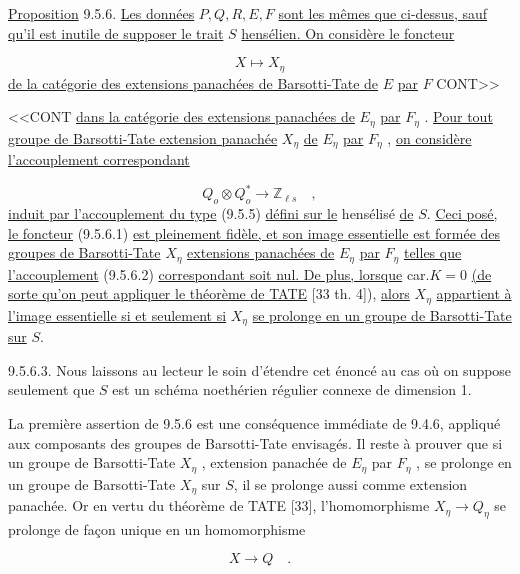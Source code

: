 \underline{Proposition} 9.5.6. \underline{Les données} $P,Q,R,E,F$ \underline{sont les mêmes que ci-dessus, sauf qu'il est inutile de supposer le trait} $S$ \underline{hensélien. On considère le foncteur}

\begin{equation}\tag{9.5.6.1}
X \longmapsto X_\eta
\end{equation}
\underline{de la catégorie des extensions panachées de Barsotti-Tate de} $E$ \underline{par} $F$ CONT>>



<<CONT \underline{dans la catégorie des extensions panachées de} $E_\eta$ \underline{par} $F_\eta$ . \underline{Pour tout groupe de Barsotti-Tate extension panachée} $X_\eta$ \underline{de} $E_\eta$ \underline{par} $F_\eta$ , \underline{on considère l'accouplement correspondant}

\begin{equation}\tag{9.5.6.2}
Q_o \otimes Q^*_o \longrightarrow \mathbb{Z}_{\ell s} \quad ,
\end{equation}
\underline{induit par l'accouplement du type} (9.5.5) \underline{défini sur le} hensélisé \underline{de} $S$. \underline{Ceci posé, le foncteur} (9.5.6.1) \underline{est pleinement fidèle, et son image essentielle est formée des groupes de Barsotti-Tate} $X_\eta$ \underline{extensions panachées de} $E_\eta$ \underline{par} $F_\eta$ \underline{telles que l'accouplement} (9.5.6.2) \underline{correspondant soit nul. De plus, lorsque} car.$K = 0$ \underline{(de sorte qu'on peut appliquer le théorème de TATE} [33 th. 4]), \underline{alors} $X_\eta$ \underline{appartient à l'image essentielle si et seulement si} $X_\eta$ \underline{se prolonge en un groupe de Barsotti-Tate sur} $S$.

9.5.6.3. Nous laissons au lecteur le soin d'étendre cet énoncé au cas où on suppose seulement que $S$ est un schéma noethérien régulier connexe de dimension 1.

La première assertion de 9.5.6 est une conséquence immédiate de 9.4.6, appliqué aux composants des groupes de Barsotti-Tate envisagés. Il reste à prouver que si un groupe de Barsotti-Tate $X_\eta$ , extension panachée de $E_\eta$ par $F_\eta$ , se prolonge en un groupe de Barsotti-Tate $X_\eta$ sur $S$, il se prolonge aussi comme extension panachée. Or en vertu du théorème de TATE [33], l'homomorphisme $X_\eta \longrightarrow Q_\eta$ se prolonge de façon unique en un homomorphisme

\begin{equation*}
X \longrightarrow Q \quad .
\end{equation*}

